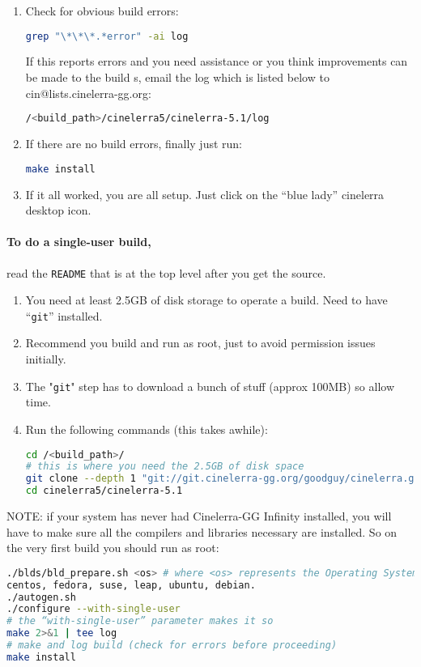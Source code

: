 \begin{enumerate}
        \begin{lstlisting}[language=bash]
./blds/bld_prepare.sh <os> # where <os> represents the Operating System of centos, fedora, suse, leap, ubuntu, debian.
./autogen.sh
./configure --prefix=/usr
# optional parameters can be added here
make 2>&1 | tee log
# make and log the build
\end{lstlisting}
\item  Check for obvious build errors:
    \begin{lstlisting}[language=bash]
grep "\*\*\*.*error" -ai log
    \end{lstlisting}
    If this reports errors and you need assistance or you think improvements can be made to the build s,
    email the log which is listed below to cin@lists.cinelerra-gg.org:
    \begin{lstlisting}[language=bash]
/<build_path>/cinelerra5/cinelerra-5.1/log
    \end{lstlisting}
\item  If there are no build errors, finally just run:
    \begin{lstlisting}[language=bash]
    make install
    \end{lstlisting}
\item  If it all worked, you are all setup. Just click on the “blue lady” cinelerra desktop icon.
\end{enumerate}

\paragraph{To do a single-user build,} read the \texttt{README} that is at the top level after you get the source.
\begin{enumerate}
    \item  You need at least 2.5GB of disk storage to operate a build. Need to have “\texttt{git}” installed.
    \item  Recommend you build and run as root, just to avoid permission issues initially.
    \item  The "\texttt{git}" step has to download a bunch of stuff (approx 100MB) so allow time.
    \item  Run the following commands (this takes awhile):
        \begin{lstlisting}[language=bash]
cd /<build_path>/
# this is where you need the 2.5GB of disk space
git clone --depth 1 "git://git.cinelerra-gg.org/goodguy/cinelerra.git" cinelerra5
cd cinelerra5/cinelerra-5.1
        \end{lstlisting}
\end{enumerate}
NOTE: if your system has never had Cinelerra-GG Infinity installed, you will have to make sure all
the compilers and libraries necessary are installed. So on the very first build you should run as root:
\begin{lstlisting}[language=bash]
./blds/bld_prepare.sh <os> # where <os> represents the Operating System of
centos, fedora, suse, leap, ubuntu, debian.
./autogen.sh
./configure --with-single-user
# the “with-single-user” parameter makes it so
make 2>&1 | tee log
# make and log build (check for errors before proceeding)
make install
\end{lstlisting}

